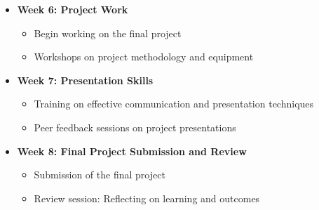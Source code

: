 \documentclass[aspectratio=169]{beamer}
\begin{document}
\begin{frame}[fragile]
\begin{itemize}
        \item \textbf{Week 6: Project Work}
        \begin{itemize}
            \item Begin working on the final project
            \item Workshops on project methodology and equipment
        \end{itemize}
        
        \item \textbf{Week 7: Presentation Skills}
        \begin{itemize}
            \item Training on effective communication and presentation techniques
            \item Peer feedback sessions on project presentations
        \end{itemize}
        
        \item \textbf{Week 8: Final Project Submission and Review}
        \begin{itemize}
            \item Submission of the final project
            \item Review session: Reflecting on learning and outcomes
        \end{itemize}
    \end{itemize}
\end{frame}
\end{document}
